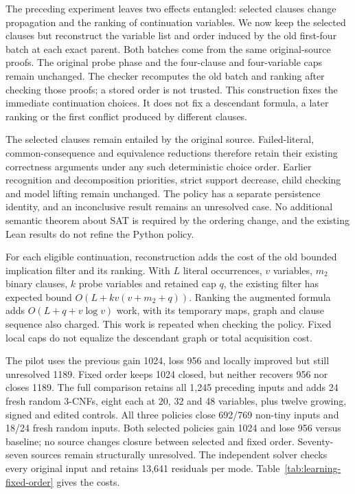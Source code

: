 \documentclass[11pt,a4paper]{article}
\numberwithin{equation}{section}
\theoremstyle{plain}
\theoremstyle{definition}
\theoremstyle{remark}
\begin{document}
The preceding experiment leaves two effects entangled: selected clauses change propagation and the ranking of continuation variables. We now keep the selected clauses but reconstruct the variable list and order induced by the old first-four batch at each exact parent. Both batches come from the same original-source proofs. The original probe phase and the four-clause and four-variable caps remain unchanged. The checker recomputes the old batch and ranking after checking those proofs; a stored order is not trusted. This construction fixes the immediate continuation choices. It does not fix a descendant formula, a later ranking or the first conflict produced by different clauses.

The selected clauses remain entailed by the original source. Failed-literal, common-consequence and equivalence reductions therefore retain their existing correctness arguments under any such deterministic choice order. Earlier recognition and decomposition priorities, strict support decrease, child checking and model lifting remain unchanged. The policy has a separate persistence identity, and an inconclusive result remains an unresolved case. No additional semantic theorem about SAT is required by the ordering change, and the existing Lean results do not refine the Python policy.

For each eligible continuation, reconstruction adds the cost of the old bounded implication filter and its ranking. With $L$ literal occurrences, $v$ variables, $m_2$ binary clauses, $k$ probe variables and retained cap $q$, the existing filter has expected bound $O(L+kv(v+m_2+q))$. Ranking the augmented formula adds $O(L+q+v\log v)$ work, with its temporary maps, graph and clause sequence also charged. This work is repeated when checking the policy. Fixed local caps do not equalize the descendant graph or total acquisition cost.

The pilot uses the previous gain 1024, loss 956 and locally improved but still unresolved 1189. Fixed order keeps 1024 closed, but neither recovers 956 nor closes 1189. The full comparison retains all 1,245 preceding inputs and adds 24 fresh random 3-CNFs, eight each at 20, 32 and 48 variables, plus twelve growing, signed and edited controls. All three policies close 692/769 non-tiny inputs and 18/24 fresh random inputs. Both selected policies gain 1024 and lose 956 versus baseline; no source changes closure between selected and fixed order. Seventy-seven sources remain structurally unresolved. The independent solver checks every original input and retains 13,641 residuals per mode. Table~\ref{tab:learning-fixed-order} gives the costs.
\end{document}
